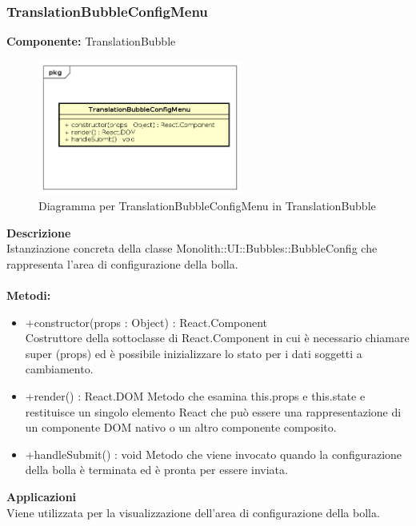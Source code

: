 \clearpage

\subsubsection{TranslationBubbleConfigMenu}
\textbf{Componente:}  TranslationBubble\\
   \FloatBarrier
   \begin{figure}[ht]
   \centering
   \includegraphics[width=0.6\textwidth]{img/single-TranslationBubbleConfigMenu}
   \caption{{Diagramma per TranslationBubbleConfigMenu in TranslationBubble}}
\end{figure}
\FloatBarrier
\textbf{Descrizione}\\
Istanziazione concreta della classe Monolith::UI::Bubbles::BubbleConfig che rappresenta l'area di configurazione della bolla. 
\\
\\
\textbf{Metodi:} 
\begin{itemize}
\item +constructor(props : Object) : React.Component 
\\
Costruttore della sottoclasse di React.Component in cui è necessario chiamare super (props) ed è possibile inizializzare lo stato per i dati soggetti a cambiamento.

\item +render() : React.DOM
Metodo che esamina this.props e this.state e restituisce un singolo elemento React che può essere una rappresentazione di un componente DOM nativo o un altro componente composito.

\item +handleSubmit() : void
Metodo che viene invocato quando la configurazione della bolla è terminata ed è pronta per essere inviata.

\end{itemize} 


\textbf{Applicazioni}\\
Viene utilizzata per la visualizzazione dell'area di configurazione della bolla. 


